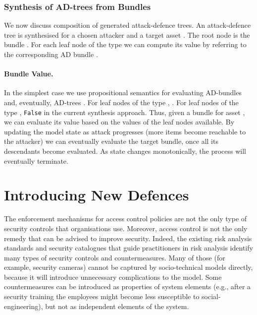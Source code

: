 \documentclass{llncs}
\begin{document}
\subsubsection{Synthesis of AD-trees from Bundles}

We now discuss composition of generated attack-defence trees. An attack-defence tree  is synthesised for a chosen attacker  and a target asset . The root node is the bundle \taccess. For each leaf node of the type \taccess we can compute its value by referring to the corresponding AD bundle . 

\paragraph{Bundle Value.}
In the simplest case we use propositional semantics for evaluating AD-bundles and, eventually, AD-trees \cite{Kordy-JLC-2014}. For leaf nodes of the type \taccess, \taccess  {}. For leaf nodes of the type \tbreak, \tbreak  \texttt{False} in the current synthesis approach. Thus, given a bundle for asset , we can evaluate its value based on the values of the leaf nodes available. By updating the model state as attack progresses (more items become reachable to the attacker) we can eventually evaluate the target bundle, once all its descendants become evaluated. As state changes monotonically, the process will eventually terminate.







\section{Introducing New Defences}\label{sec:2ndstep}
The enforcement mechanisms for access control policies are not the only type of security controls that organisations use. Moreover, access control is not the only remedy that can be advised to improve security. Indeed, the existing risk analysis standards and security catalogues that guide practitioners in risk analysis identify many types of security controls and countermeasures. Many of those (for example, security cameras) cannot be captured by socio-technical models directly, because it will introduce unnecessary complications to the model. Some countermeasures can be introduced as properties of system elements (e.g., after a security training the employees might become less susceptible to social-engineering), but not as independent elements of the system. 
\end{document}

